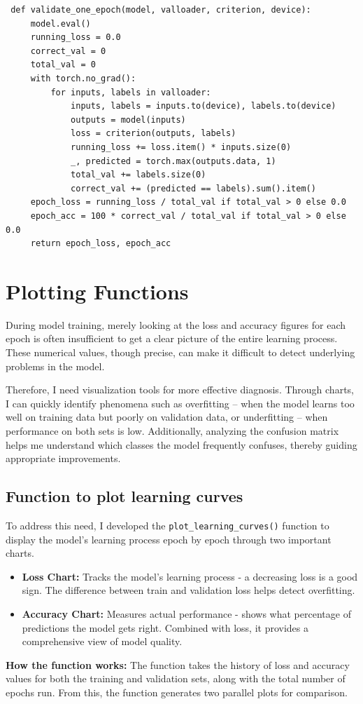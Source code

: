 \documentclass[12pt, a4paper, openany]{report}
\begin{document}
 \begin{verbatim}
 def validate_one_epoch(model, valloader, criterion, device):
     model.eval()
     running_loss = 0.0
     correct_val = 0
     total_val = 0
     with torch.no_grad():
         for inputs, labels in valloader:
             inputs, labels = inputs.to(device), labels.to(device)
             outputs = model(inputs)
             loss = criterion(outputs, labels)
             running_loss += loss.item() * inputs.size(0)
             _, predicted = torch.max(outputs.data, 1)
             total_val += labels.size(0)
             correct_val += (predicted == labels).sum().item()
     epoch_loss = running_loss / total_val if total_val > 0 else 0.0
     epoch_acc = 100 * correct_val / total_val if total_val > 0 else 0.0
     return epoch_loss, epoch_acc
 \end{verbatim}

 \section{Plotting Functions} %
 During model training, merely looking at the loss and accuracy figures for each epoch is often insufficient to get a clear picture of the entire learning process. These numerical values, though precise, can make it difficult to detect underlying problems in the model.

 Therefore, I need visualization tools for more effective diagnosis. Through charts, I can quickly identify phenomena such as overfitting – when the model learns too well on training data but poorly on validation data, or underfitting – when performance on both sets is low. Additionally, analyzing the confusion matrix helps me understand which classes the model frequently confuses, thereby guiding appropriate improvements.

 \subsection{Function to plot learning curves} %
 To address this need, I developed the \texttt{plot\_learning\_curves()} function to display the model's learning process epoch by epoch through two important charts.
 \begin{itemize}
     \item \textbf{Loss Chart:} Tracks the model's learning process - a decreasing loss is a good sign. The difference between train and validation loss helps detect overfitting. %
     \item \textbf{Accuracy Chart:} Measures actual performance - shows what percentage of predictions the model gets right. Combined with loss, it provides a comprehensive view of model quality. %
 \end{itemize}
 \textbf{How the function works:} %
 The function takes the history of loss and accuracy values for both the training and validation sets, along with the total number of epochs run. From this, the function generates two parallel plots for comparison.
\end{document}

